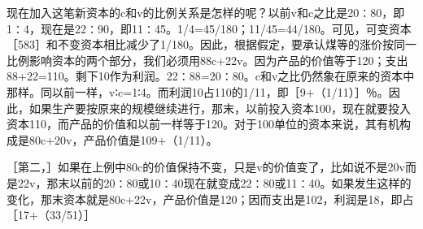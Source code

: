 现在加入这笔新资本的c和v的比例关系是怎样的呢？以前v和c之比是20∶80，即1∶4，现在是22∶90，即11∶45。1/4=45/180；11/45=44/180。可见，可变资本［583］和不变资本相比减少了1/180。因此，根据假定，要承认煤等的涨价按同一比例影响资本的两个部分，我们必须用88c+22v。因为产品的价值等于120；支出88+22=110。剩下10作为利润。22∶88=20∶80。c和v之比仍然象在原来的资本中那样。同以前一样，v∶c=1∶4。而利润10占110的1/11，即［9+（1/11）］％。因此，如果生产要按原来的规模继续进行，那末，以前投入资本100，现在就要投入资本110，而产品的价值和以前一样等于120。对于100单位的资本来说，其有机构成是80c+20v，产品价值是109+（1/11）。

［第二，］如果在上例中80c的价值保持不变，只是v的价值变了，比如说不是20v而是22v，那末以前的20∶80或10∶40现在就变成22∶80或11∶40。如果发生这样的变化，那末资本就是80c+22v，产品价值是120；因而支出是102，利润是18，即占［17+（33/51）］%

